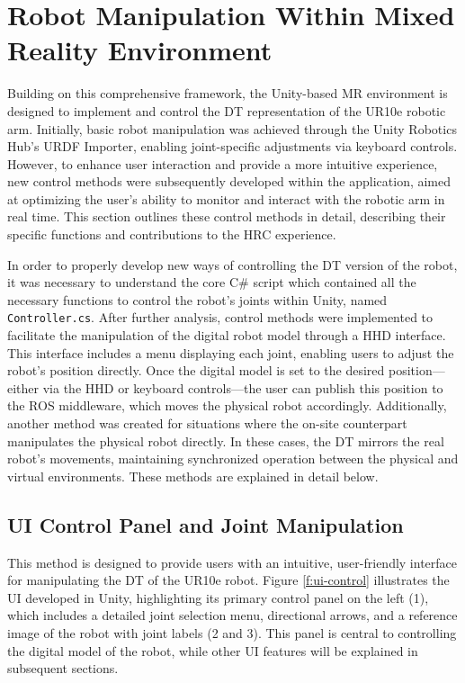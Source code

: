 \section{Robot Manipulation Within Mixed Reality Environment}

Building on this comprehensive framework, the Unity-based \ac{MR} environment is designed to implement and control the \ac{DT} representation of the UR10e robotic arm. Initially, basic robot manipulation was achieved through the Unity Robotics Hub's \ac{URDF} Importer, enabling joint-specific adjustments via keyboard controls. However, to enhance user interaction and provide a more intuitive experience, new control methods were subsequently developed within the application, aimed at optimizing the user’s ability to monitor and interact with the robotic arm in real time. This section outlines these control methods in detail, describing their specific functions and contributions to the \ac{HRC} experience. 

In order to properly develop new ways of controlling the \ac{DT} version of the robot, it was necessary to understand the core C\# script which contained all the necessary functions to control the robot's joints within Unity, named \texttt{Controller.cs}. After further analysis, control methods were implemented to facilitate the manipulation of the digital robot model through a \ac{HHD} interface. This interface includes a menu displaying each joint, enabling users to adjust the robot’s position directly. Once the digital model is set to the desired position—either via the \ac{HHD} or keyboard controls—the user can publish this position to the \ac{ROS} middleware, which moves the physical robot accordingly. Additionally, another method was created for situations where the on-site counterpart manipulates the physical robot directly. In these cases, the \ac{DT} mirrors the real robot’s movements, maintaining synchronized operation between the physical and virtual environments. These methods are explained in detail below.


\subsection{UI Control Panel and Joint Manipulation}
\label{subsection:ui-control-method}
This method is designed to provide users with an intuitive, user-friendly interface for manipulating the \ac{DT} of the UR10e robot. Figure \ref{f:ui-control} illustrates the \ac{UI} developed in Unity, highlighting its primary control panel on the left (1), which includes a detailed joint selection menu, directional arrows, and a reference image of the robot with joint labels (2 and 3). This panel is central to controlling the digital model of the robot, while other \ac{UI} features will be explained in subsequent sections.

